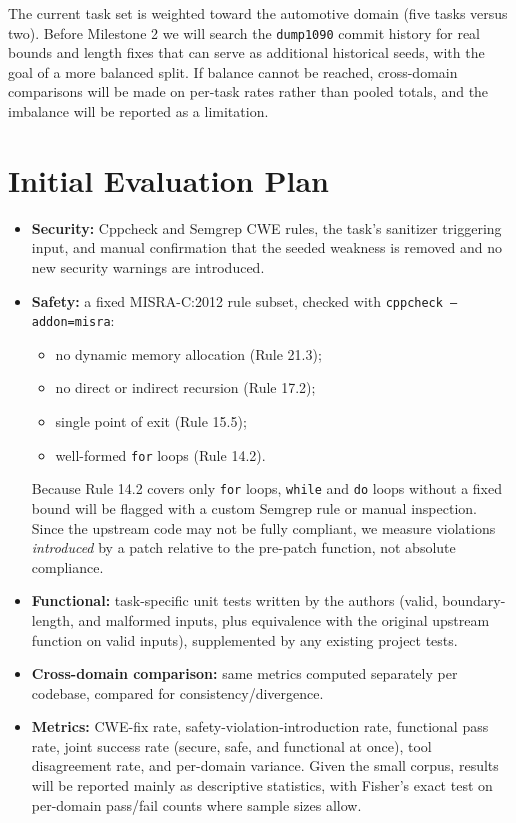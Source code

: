 \documentclass[12pt]{article}
\begin{document}
The current task set is weighted toward the automotive domain (five tasks versus two). Before Milestone 2 we will search the \texttt{dump1090} commit history for real bounds and length fixes that can serve as additional historical seeds, with the goal of a more balanced split. If balance cannot be reached, cross-domain comparisons will be made on per-task rates rather than pooled totals, and the imbalance will be reported as a limitation.

\section{Initial Evaluation Plan}
\label{sec:eval}
\begin{itemize}
    \item \textbf{Security:} Cppcheck and Semgrep CWE rules, the task's sanitizer triggering input, and manual confirmation that the seeded weakness is removed and no new security warnings are introduced.
    \item \textbf{Safety:} a fixed MISRA-C:2012 rule subset, checked with \texttt{cppcheck --addon=misra}:
    \begin{itemize}
        \item no dynamic memory allocation (Rule 21.3);
        \item no direct or indirect recursion (Rule 17.2);
        \item single point of exit (Rule 15.5);
        \item well-formed \texttt{for} loops (Rule 14.2).
    \end{itemize}
    Because Rule 14.2 covers only \texttt{for} loops, \texttt{while} and \texttt{do} loops without a fixed bound will be flagged with a custom Semgrep rule or manual inspection. Since the upstream code may not be fully compliant, we measure violations \emph{introduced} by a patch relative to the pre-patch function, not absolute compliance.
    \item \textbf{Functional:} task-specific unit tests written by the authors (valid, boundary-length, and malformed inputs, plus equivalence with the original upstream function on valid inputs), supplemented by any existing project tests.
    \item \textbf{Cross-domain comparison:} same metrics computed separately per codebase, compared for consistency/divergence.
    \item \textbf{Metrics:} CWE-fix rate, safety-violation-introduction rate, functional pass rate, joint success rate (secure, safe, and functional at once), tool disagreement rate, and per-domain variance. Given the small corpus, results will be reported mainly as descriptive statistics, with Fisher's exact test on per-domain pass/fail counts where sample sizes allow.
\end{itemize}
\end{document}
